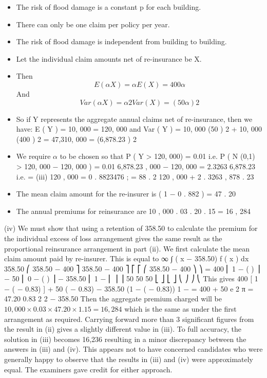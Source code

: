\documentclass[a4paper,12pt]{article}
\begin{document}
\begin{itemize}
\item The risk of flood damage is a constant p for each building.
\item There can only be one claim per policy per year.
\item The risk of flood damage is independent from building to building.
\item Let the individual claim amounts net of re-insurance be X. 
\item Then
\[E ( \alpha X ) = \alpha E ( X ) = 400 \alpha\]
And \[Var ( \alpha X ) = \alpha 2 Var ( X ) = (50 \alpha ) 2\]
\item So if Y represents the aggregate annual claims net of re-insurance, then we
have:
E ( Y ) = 10, 000   \alpha = 120, 000 \alpha
and
Var ( Y ) = 10, 000  \times (50 \alpha ) 2 + 10, 000   \times (400 \alpha ) 2 = 47,310, 000 
= (6,878.23 \alpha ) 2
\item We require $\alpha$ to be chosen so that
P ( Y > 120, 000) = 0.01
i.e. P ( N (0,1) >
120, 000 − 120, 000 \alpha
) = 0.01
6,878.23 , 000 − 120, 000 \alpha
= 2.3263
6,878.23 \alpha
i.e. \alpha =
(iii)
120 , 000
= 0 . 8823476 ; \alpha = 88 . 2 %
120 , 000 + 2 . 3263  , 878 . 23
\item The mean claim amount for the re-insurer is ( 1 − 0 . 882 )  = 47 . 20
\item The annual premiums for reinsurance are 10 , 000  . 03  . 20  . 15 = 16 , 284
\end{itemize}
(iv)
We must show that using a retention of 358.50 to calculate the premium for the individual excess of loss arrangement gives the same result as the proportional reinsurance arrangement in part (ii).
We first calculate the mean claim amount paid by re-insurer. This is equal to
∞
∫
( x − 358.50) f ( x ) dx
358.50
⎛
358.50 − 400 ⎤
358.50 − 400 ⎤
⎡
⎡
⎛ 358.50 − 400 ⎞ ⎞
= 400 ⎢ 1 − \phi  (
) ⎥ − 50 ⎢ 0 − \phi  (
) ⎥ − 358.50 \times ⎜ 1 − \phi  ⎜
⎟ ⎟
50
50
50
⎣
⎦
⎣
⎦
⎝
⎠ ⎠
⎝
This gives
400 [ 1 − \phi  ( − 0.83) ] + 50 \phi  ( − 0.83) − 358.50 \times (1 − \phi  ( − 0.83))
1 −
= 400  + 50 \times
e
2 π
= 47.20
0.83 2
2
− 358.50 
Then the aggregate premium charged will be $10, 000 \times 0.03 \times 47.20 \times 1.15 =
16,284$ which is the same as under the first arrangement as required.
Carrying forward more than 3 significant figures from the result in (ii) gives a slightly
different value in (iii). To full accuracy, the solution in (iii) becomes 16,236 resulting in a
minor discrepancy between the answers in (iii) and (iv). This appears not to have concerned
candidates who were generally happy to observe that the results in (iii) and (iv) were
approximately equal. The examiners gave credit for either approach.

\end{document}
